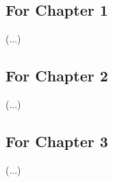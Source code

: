 \subsection{For Chapter 1}
(...)

\subsection{For Chapter 2}
(...)

\subsection{For Chapter 3}
(...)
